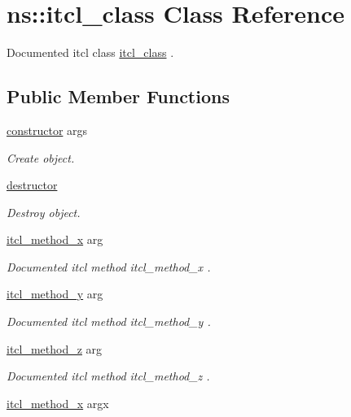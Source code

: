 \hypertarget{classns_1_1itcl__class}{}\section{ns\+::itcl\+\_\+class Class Reference}
\label{classns_1_1itcl__class}


Documented itcl class {\ttfamily \mbox{\hyperlink{classns_1_1itcl__class}{itcl\+\_\+class}}} .  


\subsection*{Public Member Functions}
\begin{DoxyCompactItemize}
\item 
\mbox{\hyperlink{classns_1_1itcl__class_a8ba2ba9d7bcb63b99a765e8f6003134b}{constructor}} args
\begin{DoxyCompactList}\small\item\em Create object. \end{DoxyCompactList}\item 
\mbox{\hyperlink{classns_1_1itcl__class_ac72f3174993656391f9b54487aa4795e}{destructor}}
\begin{DoxyCompactList}\small\item\em Destroy object. \end{DoxyCompactList}\item 
\mbox{\hyperlink{classns_1_1itcl__class_abc59160f823f3a6ec8c292c034aedbc3}{itcl\+\_\+method\+\_\+x}} arg
\begin{DoxyCompactList}\small\item\em Documented itcl method {\ttfamily itcl\+\_\+method\+\_\+x} . \end{DoxyCompactList}\item 
\mbox{\hyperlink{classns_1_1itcl__class_a092d0f8ed4796902e41fbeb1dfed82f1}{itcl\+\_\+method\+\_\+y}} arg
\begin{DoxyCompactList}\small\item\em Documented itcl method {\ttfamily itcl\+\_\+method\+\_\+y} . \end{DoxyCompactList}\item 
\mbox{\hyperlink{classns_1_1itcl__class_a13a383c766e489814960345540106cc1}{itcl\+\_\+method\+\_\+z}} arg
\begin{DoxyCompactList}\small\item\em Documented itcl method {\ttfamily itcl\+\_\+method\+\_\+z} . \end{DoxyCompactList}\item 
\mbox{\hyperlink{classns_1_1itcl__class_aad1f81467f2fca0dc02e527e786513a4}{itcl\+\_\+method\+\_\+x}} argx
\end{DoxyCompactItemize}
